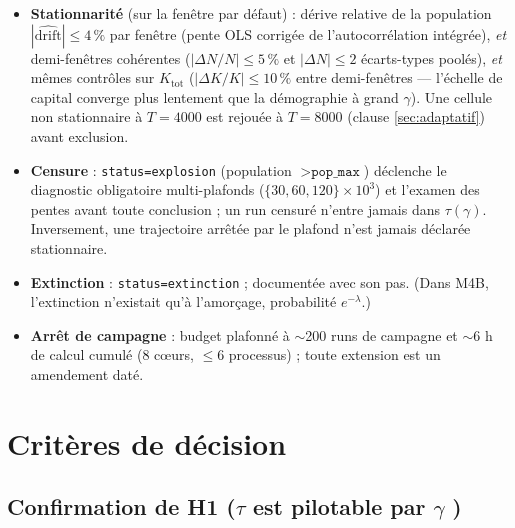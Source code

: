 \documentclass[11pt,a4paper]{article}
\newcommand{\code}[1]{\texttt{#1}}
\begin{document}
\begin{itemize}
\item \textbf{Stationnarité} (sur la fenêtre par défaut) : dérive relative
de la population $|\widehat{\mathrm{drift}}|\le4\,\%$ par fenêtre (pente
OLS corrigée de l'autocorrélation intégrée), \emph{et} demi-fenêtres
cohérentes ($|\Delta N/N|\le5\,\%$ et $|\Delta N|\le2$ écarts-types
poolés), \emph{et} mêmes contrôles sur $K_{\mathrm{tot}}$
($|\Delta K/K|\le10\,\%$ entre demi-fenêtres --- l'échelle de capital
converge plus lentement que la démographie à grand $\gamma$). Une cellule
non stationnaire à $T=4000$ est rejouée à $T=8000$ (clause
\ref{sec:adaptatif}) avant exclusion.
\item \textbf{Censure} : \code{status=explosion} (population
$>\code{pop\_max}$) déclenche le diagnostic obligatoire multi-plafonds
($\{30, 60, 120\}\times10^3$) et l'examen des pentes avant toute
conclusion ; un run censuré n'entre jamais dans $\tau(\gamma)$.
Inversement, une trajectoire arrêtée par le plafond n'est jamais déclarée
stationnaire.
\item \textbf{Extinction} : \code{status=extinction} ; documentée avec son
pas. (Dans M4B, l'extinction n'existait qu'à l'amorçage, probabilité
$e^{-\lambda}$.)
\item \textbf{Arrêt de campagne} : budget plafonné à $\sim$200 runs de
campagne et $\sim$6 h de calcul cumulé (8 cœurs, $\le6$ processus) ; toute
extension est un amendement daté.
\end{itemize}

\section{Critères de décision}
\label{sec:criteres}

\subsection{Confirmation de H1 (\og $\tau$ est pilotable par $\gamma$ \fg)}
\end{document}
